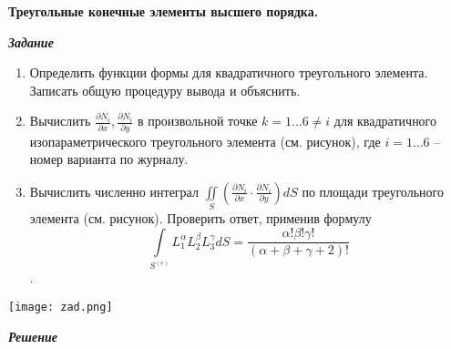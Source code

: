 \documentclass[a4paper, 12pt]{article}
\begin{document}
\begin{center}
\textbf{Треугольные конечные элементы высшего порядка.}
\end{center}
\begin{center}
\textbf{\textit{Задание}}
\end{center}

\begin{enumerate}
    \item Определить функции формы для квадратичного треугольного элемента. Записать общую процедуру вывода и объяснить.
    \item Вычислить \(\displaystyle \frac{\partial N_i}{\partial x}, \frac{\partial N_i}{\partial y}\) в произвольной точке $k = 1 \dots 6 \neq i$ для квадратичного изопараметрического треугольного элемента (см. рисунок), где $i = 1 \dots 6$ – номер варианта по журналу.
    \item Вычислить численно интеграл \(\displaystyle \iint \limits_S \left ( \frac{\partial N_i}{\partial x} \cdot \frac{\partial N_i}{\partial y} \right ) dS\) по площади треугольного элемента (см. рисунок). Проверить ответ, применив формулу \[\displaystyle \int \limits_{S^{(e)}} L_1^{\alpha} L_2^{\beta} L_3^{\gamma} dS = \frac{\alpha! \beta! \gamma!}{(\alpha + \beta + \gamma + 2)!}\].
\end{enumerate}

\begin{center}
    \texttt{[image: zad.png]}
\end{center}


\begin{center}
    \textbf{\textit{Решение}}
\end{center}
\end{document}
